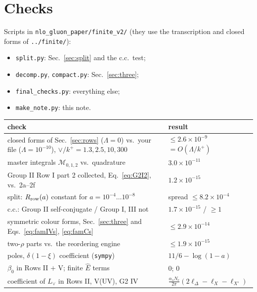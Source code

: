 \documentclass[10pt]{article}
\numberwithin{equation}{section}
\newcommand{\Lv}{L_{\vee}}
\newcommand{\Eh}{\hat E}
\begin{document}
\section{Checks}\label{sec:checks}
Scripts in \texttt{nlo\_gluon\_paper/finite\_v2/} (they use the transcription and closed forms of \texttt{../finite/}):
\begin{itemize}
\item \texttt{split.py}: Sec.~\ref{sec:split} and the c.c.\ test;
\item \texttt{decomp.py}, \texttt{compact.py}: Sec.~\ref{sec:three};
\item \texttt{final\_checks.py}: everything else;
\item \texttt{make\_note.py}: this note.
\end{itemize}
\begin{table}[H]\centering\small
\begin{tabular}{@{}p{}p{}@{}}\toprule
check & result\\\midrule
closed forms of Sec.~\ref{sec:rows} ($\Lambda=0$) vs.\ your file ($\Lambda=10^{-10}$), $\vee/k^+=1.3,2.5,10,300$ & $\le$$2.6\times10^{-9}$ $=O(\Lambda/k^+)$\\
master integrals $\mathcal M_{0,1,2}$ vs.\ quadrature & $3.0\times10^{-11}$\\
Group II Row I part 2 collected, Eq.~\eqref{eq:G2I2}, vs.\ 2a--2f & $1.2\times10^{-15}$\\
split: $R_{\rm row}(a)$ constant for $a=10^{-4}\dots10^{-8}$ & spread $\le$$8.2\times10^{-4}$\\
c.c.: Group II self-conjugate / Group I, III not & $1.7\times10^{-15}$ / $\ge1$\\
symmetric colour forms, Sec.~\ref{sec:three} and Eqs.~\eqref{eq:famIVs}, \eqref{eq:famCs} & $\le$$2.9\times10^{-14}$\\
two-$\rho$ parts vs.\ the reordering engine & $\le$$1.9\times10^{-15}$\\
poles, $\delta(1-\xi)$ coefficient (\texttt{sympy}) & $11/6 - \log(1 - a)$\\
$\beta_0$ in Rows II $+$ V; finite $\Eh$ terms & $0$; $0$\\
coefficient of $\Lv$ in Rows II, V(UV), G2 IV & $\frac{\alpha_sN_c}{2\pi}(2\ell_\Delta-\ell_X-\ell_{X'})$\\\bottomrule
\end{tabular}
\end{table}
\end{document}
